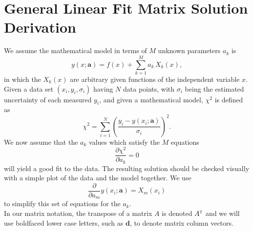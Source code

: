\documentclass[12pt]{article}
\begin{document}
\section{General Linear Fit Matrix Solution Derivation}
We assume the mathematical model in terms of $M$ unknown parameters $a_k$ is
\begin{equation}  \label{eq:lin2}
  y(x; \mathbf{a}) = f(x) + \sum_{k=1}^M a_k \, X_k(x),
\end{equation}  
  in which the $X_k(x)$ are arbitrary given functions of the
  independent variable $x$.\\

\noindent Given  a data set $(x_i, y_i,\sigma_i)$ having $N$ data points,
    with $\sigma_i$ being the estimated uncertainty of each measured $y_i$,
  and  given a mathematical model,   $\chi^2$ is defined as
\begin{equation} \label{eq:lin1}
 \chi^2 = \sum_{i=1}^N \left( \frac{y_i - y(x_i; \mathbf{a})}{\sigma_i} \right)^2.
\end{equation}   
We now assume that the $a_k$ values which satisfy the $M$ equations
\begin{equation}   \label{eq:lin3}
 \frac{\partial \chi^2}{\partial a_k} = 0
\end{equation}  
  will yield a good fit to the data.
The resulting solution should be checked visually with a simple plot of the
  data and the model together.  
We use
\begin{equation}    \label{eq:lin4}
 \frac{\partial}{\partial a_m} y(x_i; \mathbf{a}) = X_m(x_i)
\end{equation}  
  to simplify this set of equations for the $a_k$.\\
  
\noindent In our matrix notation, the transpose of a matrix $A$  is denoted $A^{\textsc{t}}$
  and we will use boldfaced lower case letters, such as $\mathbf{d}$, to denote
  matrix column vectors.\\
  
\end{document}
